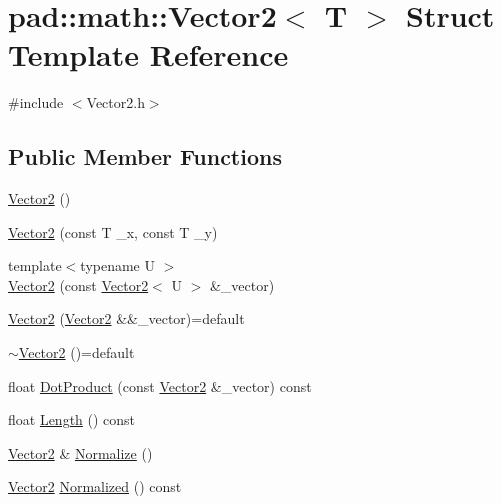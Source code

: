 \hypertarget{structpad_1_1math_1_1_vector2}{}\section{pad\+:\+:math\+:\+:Vector2$<$ T $>$ Struct Template Reference}
\label{structpad_1_1math_1_1_vector2}


{\ttfamily \#include $<$Vector2.\+h$>$}

\subsection*{Public Member Functions}
\begin{DoxyCompactItemize}
\item 
\mbox{\hyperlink{structpad_1_1math_1_1_vector2_afaa3496649b893db8720d87c9dc4f03f}{Vector2}} ()
\item 
\mbox{\hyperlink{structpad_1_1math_1_1_vector2_ab21c64ccea2b5c873a9edf99c452e5a8}{Vector2}} (const T \+\_\+x, const T \+\_\+y)
\item 
{\footnotesize template$<$typename U $>$ }\\\mbox{\hyperlink{structpad_1_1math_1_1_vector2_aec2b96f829aab2b0676be107f35ba20d}{Vector2}} (const \mbox{\hyperlink{structpad_1_1math_1_1_vector2}{Vector2}}$<$ U $>$ \&\+\_\+vector)
\item 
\mbox{\hyperlink{structpad_1_1math_1_1_vector2_aa13fef545bfcfad2d085505821d9af37}{Vector2}} (\mbox{\hyperlink{structpad_1_1math_1_1_vector2}{Vector2}} \&\&\+\_\+vector)=default
\item 
\mbox{\hyperlink{structpad_1_1math_1_1_vector2_afb8d7ff79388a1d6fcf2e54a5303bf39}{$\sim$\+Vector2}} ()=default
\item 
float \mbox{\hyperlink{structpad_1_1math_1_1_vector2_a4e06866137ababf33fafbad672c77e75}{Dot\+Product}} (const \mbox{\hyperlink{structpad_1_1math_1_1_vector2}{Vector2}} \&\+\_\+vector) const
\item 
float \mbox{\hyperlink{structpad_1_1math_1_1_vector2_a8e02a8ac515710f437624863b1ce1655}{Length}} () const
\item 
\mbox{\hyperlink{structpad_1_1math_1_1_vector2}{Vector2}} \& \mbox{\hyperlink{structpad_1_1math_1_1_vector2_a58d0df7fcb5f69cebce9e28fc94bf8f5}{Normalize}} ()
\item 
\mbox{\hyperlink{structpad_1_1math_1_1_vector2}{Vector2}} \mbox{\hyperlink{structpad_1_1math_1_1_vector2_ad940f1a2e4e6c58f742e85327493750a}{Normalized}} () const
\item 

\end{DoxyCompactItemize}
